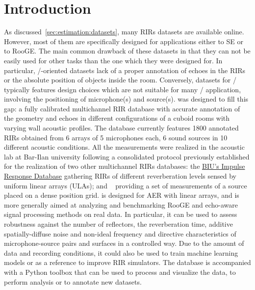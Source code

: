 \section{Introduction}\label{sec:dechorate:intro}
As discussed~\cref{sec:estimation:datasets}, many \acp{RIR} datasets are available online.
However, most of them are specifically designed for applications either to \acf{SE} or to \acf{RooGE}.
The main common drawback of these datasets in that they can not be easily used for other tasks than the one which they were designed for.
In particular, \SE/-oriented datasets lack of a proper annotation of echoes in the \acp{RIR} or the absolute position of objects inside the room.
Conversely, datasets for \RooGE/ typically features design choices which are not suitable for many \SE/ application, involving the positioning of microphone(s) and source(s).
\dEchorate{} was designed to fill this gap: a fully calibrated multichannel \ac{RIR} database with accurate annotation of the geometry and echoes in different configurations of a cuboid rooms with varying wall acoustic profiles.
The database currently features 1800 annotated \acp{RIR} obtained from 6 arrays of 5 microphones each, 6 sound sources in 10 different acoustic conditions.
All the measurements were realized in the acoustic lab at Bar-Ilan university following a consolidated protocol previously established for the realization of two other multichannel \acp{RIR} databases:
the \href{http://www.eng.biu.ac.il/~gannot/RIR_DATABASE/}{BIU's Impulse Response Database\ExternalLink}  gathering \acp{RIR} of different reverberation levels sensed by uniform linear arrays (ULAs);
and \href{https://asap.ite.tul.cz/downloads/MIRaGe/}{\ExternalLink}~ providing a set of measurements of a source placed on a dense position grid.
\dEchorate{} is designed for \acf{AER} with linear arrays, and is more generally aimed at analyzing and benchmarking RooGE and echo-aware signal processing methods on real data.
In particular, it can be used to assess robustness against the number of reflectors, the reverberation time, additive spatially-diffuse noise and non-ideal frequency and directive characteristics of microphone-source pairs and surfaces in a controlled way.
Due to the amount of data and recording conditions, it could also be used to train machine learning models or as a reference to improve \ac{RIR} simulators.
The database is accompanied with a Python toolbox that can be used to process and visualize the data, to perform analysis or to annotate new datasets.

